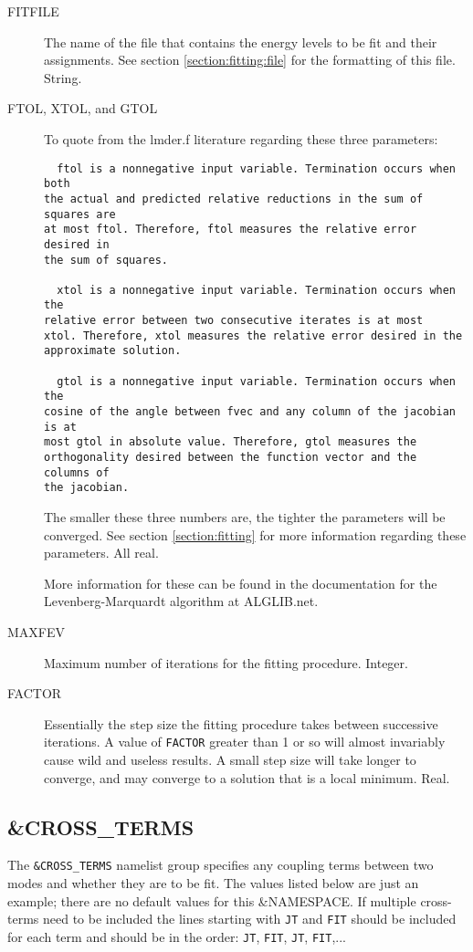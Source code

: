 \documentclass{article}
\begin{document}
\begin{description}

\item[FITFILE] The name of the file that contains the energy levels
  to be fit and their assignments.  See section \ref{section:fitting:file} for
  the formatting of this file. String.

\item[FTOL, XTOL, and GTOL] To quote from the lmder.f
  literature regarding these three parameters:
  \begin{verbatim}
  ftol is a nonnegative input variable. Termination occurs when both
the actual and predicted relative reductions in the sum of squares are
at most ftol. Therefore, ftol measures the relative error desired in
the sum of squares. 

  xtol is a nonnegative input variable. Termination occurs when the
relative error between two consecutive iterates is at most
xtol. Therefore, xtol measures the relative error desired in the
approximate solution. 

  gtol is a nonnegative input variable. Termination occurs when the
cosine of the angle between fvec and any column of the jacobian is at
most gtol in absolute value. Therefore, gtol measures the
orthogonality desired between the function vector and the columns of
the jacobian. 
 \end{verbatim}

 The smaller these three numbers are, the tighter the parameters will
 be converged. See section \ref{section:fitting} for more
 information regarding these parameters. All real.
 
 More information for these can be found in the documentation for the Levenberg-Marquardt algorithm at ALGLIB.net.\cite{alglib}

\item[MAXFEV] Maximum number of iterations for the fitting
  procedure. Integer.

\item[FACTOR] Essentially the step size the fitting procedure takes
  between successive iterations. A value of {\tt FACTOR} greater than 1 or
  so will almost invariably cause wild and useless results. A small
  step size will take longer to converge, and may converge to a
  solution that is a local minimum. Real.

\end{description}

\subsection{\&CROSS\_TERMS} The {\tt \&CROSS\_TERMS} namelist group specifies
any coupling terms between two modes and whether they are to be fit. The values listed below are just an example; there are no default values for this \&NAMESPACE. If multiple cross-terms need to be included the lines starting with {\tt JT} and {\tt FIT} should be included for each term and should be in the order: {\tt JT}, {\tt FIT}, {\tt JT}, {\tt FIT},...
\end{document}
